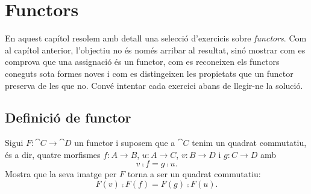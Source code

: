 \chapter{Functors}\label{cap:practica-functors}

En aquest capítol resolem amb detall una selecció d'exercicis sobre \emph{functors}. Com al capítol anterior, l'objectiu no és només arribar al resultat, sinó mostrar com es comprova que una assignació és un functor, com es reconeixen els functors coneguts sota formes noves i com es distingeixen les propietats que un functor preserva de les que no. Convé intentar cada exercici abans de llegir-ne la solució.

\section{Definició de functor}

\begin{exercici}\label{prac:functor-quadrat}
Sigui $F\colon\cat{C}\to\cat{D}$ un functor i suposem que a $\cat{C}$ tenim un quadrat commutatiu, és a dir, quatre morfismes $f\colon A\to B$, $u\colon A\to C$, $v\colon B\to D$ i $g\colon C\to D$ amb
\[
v\comp f=g\comp u.
\]
Mostra que la seva imatge per $F$ torna a ser un quadrat commutatiu:
\[
F(v)\comp F(f)=F(g)\comp F(u).
\]
\end{exercici}

